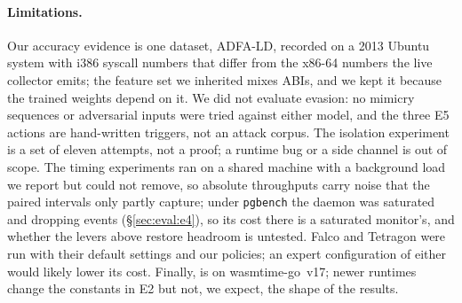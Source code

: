 \paragraph{Limitations.}
Our accuracy evidence is one dataset, ADFA-LD, recorded on a 2013 Ubuntu
system with i386 syscall numbers that differ from the x86-64 numbers the
live collector emits; the feature set we inherited mixes ABIs, and we kept
it because the trained weights depend on it. We did not evaluate evasion:
no mimicry sequences or adversarial inputs were tried against either model,
and the three E5 actions are hand-written triggers, not an attack corpus.
The isolation experiment is a set of eleven attempts, not a proof; a
runtime bug or a side channel is out of scope. The timing experiments ran
on a shared machine with a background load we report but could not remove,
so absolute throughputs carry noise that the paired intervals only partly
capture; under \texttt{pgbench} the daemon was saturated and dropping
events (\S\ref{sec:eval:e4}), so its cost there is a saturated monitor's,
and whether the levers above restore headroom is untested. Falco and Tetragon were run
with their default settings and our policies; an expert configuration of
either would likely lower its cost. Finally, \sys is on wasmtime-go~v17;
newer runtimes change the constants in E2 but not, we expect, the shape of
the results.
